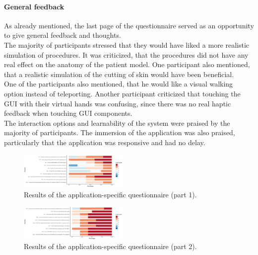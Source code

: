 \paragraph{General feedback}
As already mentioned, the last page of the questionnaire served as 
an opportunity to give general feedback and thoughts.
\\ The majority of participants stressed that they would have liked
a more realistic simulation of procedures. It was criticized,
that the procedures did not have any real effect on the anatomy
of the patient model. One participant also mentioned,
that a realistic simulation of the cutting of skin would have
been beneficial. 
\\ One of the participants also mentioned, that he would like
a visual walking option instead of teleporting. Another participant
criticized that touching the GUI with their virtual hands 
was confusing, since there was no real haptic feedback when 
touching GUI components. 
\\ The interaction options 
and learnability of the system were praised by the majority of 
participants. The immersion of the application was also praised,
particularly that the application was responsive and had no 
delay. 



\begin{figure}[ht]
    \centering
    \includegraphics[width=200px]{images/evaluation/VR-SET1.png}
    \caption{\label{fig::vrSet1}Results of the application-specific questionnaire (part 1).}
\end{figure}

\begin{figure}[ht]
    \centering
    \includegraphics[width=200px]{images/evaluation/VR-SET2.png}
    \caption{\label{fig::vrSet2}Results of the application-specific questionnaire (part 2).}
\end{figure}